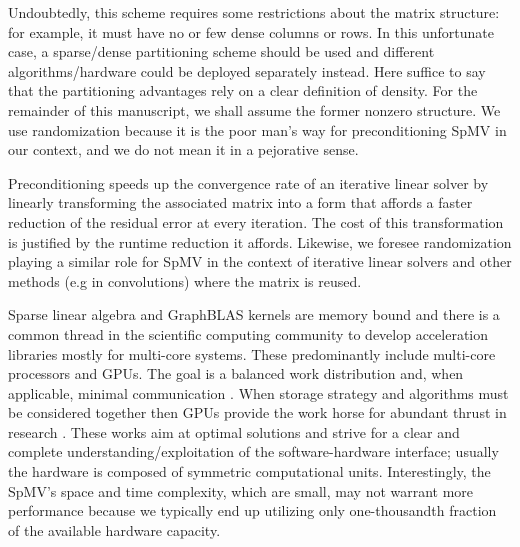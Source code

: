 \documentclass[acmsmall]{acmart}
\begin{document}
Undoubtedly, this scheme requires some restrictions about the matrix
structure: for example, it must have no or few dense columns or rows.
In this unfortunate case, a sparse/dense partitioning scheme should be
used and different algorithms/hardware could be deployed separately
instead. Here suffice to say that the partitioning advantages rely on
a clear definition of density.  For the remainder of this manuscript,
we shall assume the former nonzero structure. We use randomization
because it is the poor man's way for preconditioning SpMV in our
context, and we do not mean it in a pejorative sense.


Preconditioning speeds up the convergence rate of an iterative linear
solver by linearly transforming the associated matrix into a form that
affords a faster reduction of the residual error at every iteration.
The cost of this transformation is justified by the runtime reduction
it affords.  Likewise, we foresee randomization playing a similar role
for SpMV in the context of iterative linear solvers and other methods
(e.g in convolutions) where the matrix is reused.

Sparse linear algebra and GraphBLAS kernels are memory bound and there
is a common thread in the scientific computing community to develop
acceleration libraries mostly for multi-core systems. These
predominantly include multi-core processors and GPUs. The goal is
a balanced work distribution and, when applicable, minimal
communication
\cite{DBLP:journals/siamsc/KayaaslanAU18,DBLP:conf/ieeehpcs/PageK18}. When
storage strategy and algorithms must be considered together then GPUs
provide the work horse for abundant thrust in research
\cite{DBLP:journals/topc/AnztCYDFNTTW20}. These works aim at optimal
solutions and strive for a clear and complete
understanding/exploitation of the software-hardware interface; usually
the hardware is composed of symmetric computational
units. Interestingly, the SpMV's space and time complexity, which are
small, may not warrant more performance because we typically end up
utilizing only one-thousandth fraction of the available hardware
capacity.
\end{document}
